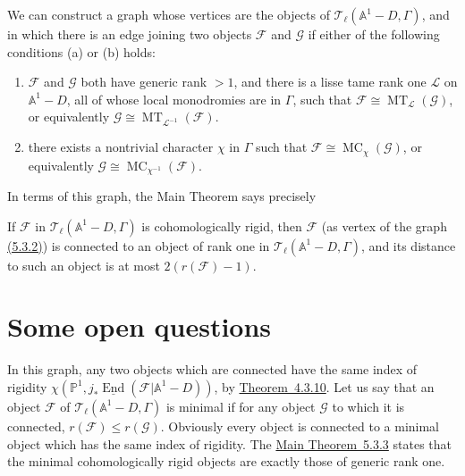 We can construct a graph whose vertices are the objects of
\(\mathcal{T}_\ell(\mathbb{A}^1-D,\Gamma)\), and in which there is an edge
joining two objects \(\mathcal{F}\) and \(\mathcal{G}\) if either of the
following conditions (a) or (b) holds:
\begin{enumerate}[label=(\alph*)]
\item \(\mathcal{F}\) and \(\mathcal{G}\) both have generic rank \(>1\), and
there is a lisse tame rank one \(\mathcal{L}\) on \(\mathbb{A}^1-D\), all of
whose local monodromies are in \(\Gamma\), such that
\(\mathcal{F}\cong\operatorname{MT}_{\mathcal{L}}(\mathcal{G})\), or
equivalently
\(\mathcal{G}\cong\operatorname{MT}_{\mathcal{L}^{-1}}(\mathcal{F})\).

\item there exists a nontrivial character \(\chi\) in \(\Gamma\) such that
\(\mathcal{F}\cong\operatorname{MC}_\chi(\mathcal{G})\), or equivalently
\(\mathcal{G}\cong\operatorname{MC}_{\chi^{-1}}(\mathcal{F})\).
\end{enumerate}
In terms of this graph, the Main Theorem says precisely

If \(\mathcal{F}\) in \(\mathcal{T}_\ell(\mathbb{A}^1-D,\Gamma)\) is
cohomologically rigid, then \(\mathcal{F}\) (as vertex of the graph
\hyperref[par:5.3.2]{(5.3.2)}) is connected to an object of rank one in
\(\mathcal{T}_\ell(\mathbb{A}^1-D,\Gamma)\), and its distance to such an
object is at most \(2(r(\mathcal{F})-1)\).

\section{Some open questions}\label{sec:5.4}

In this graph, any two objects which are connected have the same index of
rigidity
\(\chi(\mathbb{P}^1,j_*\underline{\operatorname{End}}(\mathcal{F}\vert\mathbb{A}^1-D))\),
by \hyperref[thm:4.3.10]{Theorem~4.3.10}. Let us say that an object
\(\mathcal{F}\) of \(\mathcal{T}_\ell(\mathbb{A}^1-D,\Gamma)\) is minimal if
for any object \(\mathcal{G}\) to which it is connected,
\(r(\mathcal{F})\leq r(\mathcal{G})\). Obviously every object is connected to a
minimal object which has the same index of rigidity. The
\hyperref[thm:5.3.3]{Main Theorem~5.3.3} states that the minimal
cohomologically rigid objects are exactly those of generic rank one.

